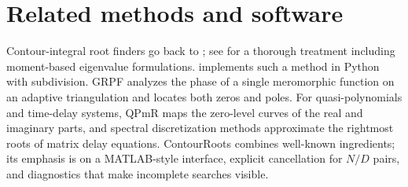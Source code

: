 \section{Related methods and software}\label{sec:related}

Contour-integral root finders go back to \citet{delves1967}; see
\citet{kravanja2000} for a thorough treatment including moment-based
eigenvalue formulations.  \citep{cxroots} implements such a
method in Python with subdivision. GRPF \citep{grpf} analyzes the phase of a
single meromorphic function on an adaptive triangulation and locates both
zeros and poles. For quasi-polynomials and time-delay systems, QPmR
\citep{vyhlidal2009} maps the zero-level curves of the real and imaginary
parts, and spectral discretization methods \citep{breda2005,breda2015,michiels2014}
approximate the rightmost roots of matrix delay equations. ContourRoots
combines well-known ingredients; its emphasis is on a MATLAB-style
interface, explicit cancellation for $N/D$ pairs, and diagnostics that make
incomplete searches visible.
